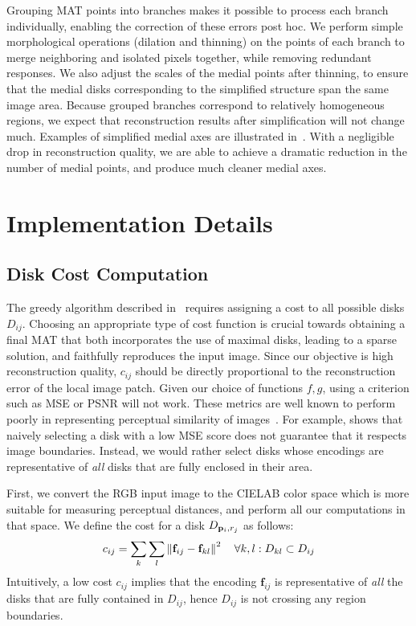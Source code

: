 \documentclass[10pt,twocolumn,letterpaper]{article}
\begin{document}
Grouping MAT points into branches makes it possible to process each branch individually, enabling
the correction of these errors post hoc.
We perform simple morphological operations (dilation and thinning) 
on the points of each branch to merge neighboring and isolated pixels together, while removing 
redundant responses. 
We also adjust the scales of the medial points after thinning, to ensure that the medial disks corresponding 
to the simplified structure span the same image area.
Because grouped branches correspond to relatively homogeneous regions, we expect that reconstruction
results after simplification will not change much.
Examples of simplified medial axes are illustrated in~.
With a negligible drop in reconstruction quality, we are able to achieve a dramatic reduction
in the number of medial points, and produce much cleaner medial axes.


\section{Implementation Details}\label{sec:method:implementation}
\subsection{Disk Cost Computation}\label{sec:method:diskcost}
The greedy algorithm described in~ requires assigning a cost to all possible disks $D_{ij}$.
Choosing an appropriate type of cost function is crucial towards obtaining a final MAT that both incorporates
the use of maximal disks, leading to a sparse solution, and faithfully reproduces the input image.
Since our objective is high reconstruction quality, $c_{ij}$ should be directly proportional
to the reconstruction error of the local image patch.
Given our choice of functions $f,g$, using a criterion such as MSE or PSNR will not work.
These metrics are well known to perform poorly in representing perceptual similarity of images~\cite{girod1993what,wang2009mean}.
For example,  shows that naively selecting a disk with a low MSE score does not guarantee that it 
respects image boundaries.
Instead, we would rather select disks whose encodings are representative of \emph{all} disks that are fully enclosed
in their area. 

First, we convert the RGB input image to the CIELAB color space which is more suitable for measuring perceptual distances,
and perform all our computations in that space.
We define the cost for a disk $D_{\mathbf{p}_{i},r_j}$ as follows:
\begin{equation}
c_{ij} = \sum_k \sum_l \left \lVert \mathbf{f}_{ij} - \mathbf{f}_{kl}  \right \rVert^2 \quad \forall k,l: D_{kl} \subset D_{ij}
\label{eq:diskcost}
\end{equation}
Intuitively, a low cost $c_{ij}$ implies that the encoding $\mathbf{f}_{ij}$ is representative of \emph{all}
the disks that are fully contained in $D_{ij}$, hence $D_{ij}$ is not crossing any region boundaries.
\end{document}
